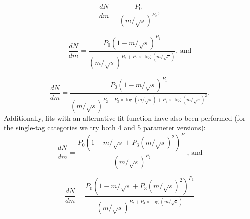 \begin{equation}
\label{eq:dijet2}
\frac{dN}{dm}= \frac{ P_0 } { (m/\sqrt{s})^{P_2} },
\end{equation}

\begin{equation}
\label{eq:dijet4}
\frac{dN}{dm}= \frac{ P_0(1-m/\sqrt{s})^{P_1} } { (m/\sqrt{s})^{P_2+P_3\times\log(m/\sqrt{s})} } \textrm{, and}
\end{equation}

\begin{equation}
\label{eq:dijet5}
\frac{dN}{dm}= \frac{ P_0(1-m/\sqrt{s})^{P_1} } { (m/\sqrt{s})^{P_2+P_3\times\log(m/\sqrt{s})+P_4\times\log(m/\sqrt{s})^2} }.
\end{equation}
Additionally, fits with an alternative fit function have also been performed (for the single-tag categories we try both 4 and 5 parameter versions):
\begin{equation}
\label{eq:dijet6}
\frac{dN}{dm}= \frac{ P_0(1-m/\sqrt{s}+P_3(m/\sqrt{s})^2)^{P_1} } { (m/\sqrt{s})^{P_2} }\textrm{, and}
\end{equation}

\begin{equation}
\label{eq:dijet7}
\frac{dN}{dm}= \frac{ P_0(1-m/\sqrt{s}+P_3(m/\sqrt{s})^2)^{P_1} } { (m/\sqrt{s})^{P_2+P_4\times\log(m/\sqrt{s})} }
\end{equation}
\clearpage
